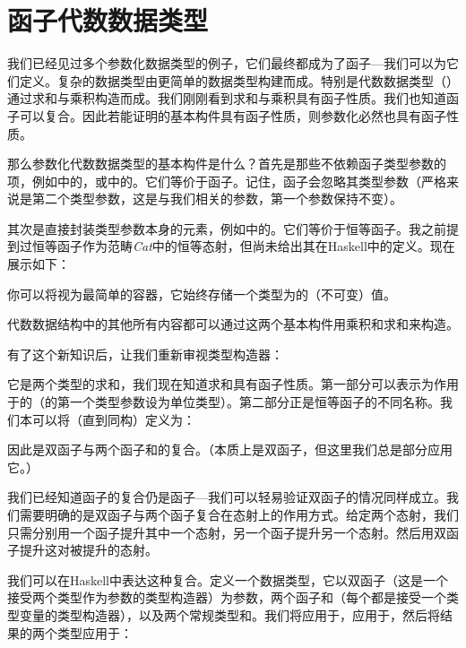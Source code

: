 \section{函子代数数据类型}

我们已经见过多个参数化数据类型的例子，它们最终都成为了函子---我们可以为它们定义。复杂的数据类型由更简单的数据类型构建而成。特别是代数数据类型（）通过求和与乘积构造而成。我们刚刚看到求和与乘积具有函子性质。我们也知道函子可以复合。因此若能证明的基本构件具有函子性质，则参数化必然也具有函子性质。

那么参数化代数数据类型的基本构件是什么？首先是那些不依赖函子类型参数的项，例如中的，或中的。它们等价于函子。记住，函子会忽略其类型参数（严格来说是第二个类型参数，这是与我们相关的参数，第一个参数保持不变）。

其次是直接封装类型参数本身的元素，例如中的。它们等价于恒等函子。我之前提到过恒等函子作为范畴\emph{Cat}中的恒等态射，但尚未给出其在Haskell中的定义。现在展示如下：


你可以将视为最简单的容器，它始终存储一个类型为的（不可变）值。

代数数据结构中的其他所有内容都可以通过这两个基本构件用乘积和求和来构造。

有了这个新知识后，让我们重新审视类型构造器：

它是两个类型的求和，我们现在知道求和具有函子性质。第一部分可以表示为作用于的（的第一个类型参数设为单位类型）。第二部分正是恒等函子的不同名称。我们本可以将（直到同构）定义为：

因此是双函子与两个函子和的复合。（本质上是双函子，但这里我们总是部分应用它。）

我们已经知道函子的复合仍是函子---我们可以轻易验证双函子的情况同样成立。我们需要明确的是双函子与两个函子复合在态射上的作用方式。给定两个态射，我们只需分别用一个函子提升其中一个态射，另一个函子提升另一个态射。然后用双函子提升这对被提升的态射。

我们可以在Haskell中表达这种复合。定义一个数据类型，它以双函子（这是一个接受两个类型作为参数的类型构造器）为参数，两个函子和（每个都是接受一个类型变量的类型构造器），以及两个常规类型和。我们将应用于，应用于，然后将结果的两个类型应用于：

